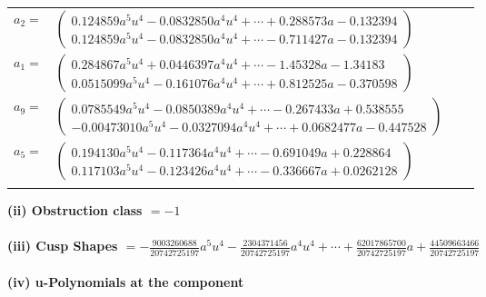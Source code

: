 \documentclass[1p]{elsarticle_modified}
\theoremstyle{definition}
\begin{document}
\begin{tabular}{m{7pt} m{180pt} m{7pt} m{180pt} }
\flushright $a_{2}=$&$\begin{pmatrix}0.124859 a^{5} u^{4}-0.0832850 a^{4} u^{4}+\cdots+0.288573 a-0.132394\\0.124859 a^{5} u^{4}-0.0832850 a^{4} u^{4}+\cdots-0.711427 a-0.132394\end{pmatrix}$ \\
\flushright $a_{1}=$&$\begin{pmatrix}0.284867 a^{5} u^{4}+0.0446397 a^{4} u^{4}+\cdots-1.45328 a-1.34183\\0.0515099 a^{5} u^{4}-0.161076 a^{4} u^{4}+\cdots+0.812525 a-0.370598\end{pmatrix}$ \\
\flushright $a_{9}=$&$\begin{pmatrix}0.0785549 a^{5} u^{4}-0.0850389 a^{4} u^{4}+\cdots-0.267433 a+0.538555\\-0.00473010 a^{5} u^{4}-0.0327094 a^{4} u^{4}+\cdots+0.0682477 a-0.447528\end{pmatrix}$ \\
\flushright $a_{5}=$&$\begin{pmatrix}0.194130 a^{5} u^{4}-0.117364 a^{4} u^{4}+\cdots-0.691049 a+0.228864\\0.117103 a^{5} u^{4}-0.123426 a^{4} u^{4}+\cdots-0.336667 a+0.0262128\end{pmatrix}$\\&\end{tabular}
\flushleft \textbf{(ii) Obstruction class $= -1$}\\~\\
\flushleft \textbf{(iii) Cusp Shapes $= -\frac{9003260688}{20742725197} a^5 u^4-\frac{2304371456}{20742725197} a^4 u^4+\cdots+\frac{62017865700}{20742725197} a+\frac{44509663466}{20742725197}$}\\~\\
\newpage\renewcommand{\arraystretch}{1}
\flushleft \textbf{(iv) u-Polynomials at the component}\newline \\
\end{document}
